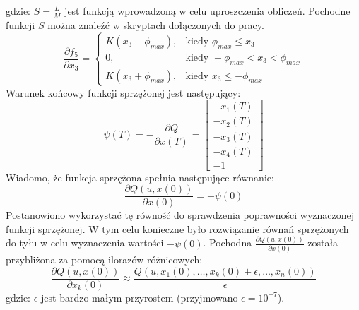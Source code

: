 \noindent gdzie:\newline
\(S=\frac{L}{M}\) jest funkcją wprowadzoną w celu uproszczenia obliczeń. Pochodne funkcji \(S\) można znaleźć w skryptach dołączonych do pracy.
\begin{equation}
\frac{\partial f_5}{\partial x_3}=
	\begin{cases}
	K(x_3-\phi_{max}), & \text{kiedy } \phi_{max}\leqslant x_3\\
	0, & \text{kiedy } -\phi_{max}<x_3<\phi_{max}\\
	K(x_3+\phi_{max}), & \text{kiedy } x_3\leqslant -\phi_{max}
	\end{cases}
\end{equation}
Warunek końcowy funkcji sprzężonej jest następujący:
\begin{equation}
\psi(T)=-\frac{\partial Q}{\partial x(T)}=
\begin{bmatrix}
-x_1(T)\\
-x_2(T)\\
-x_3(T)\\
-x_4(T)\\
-1
\end{bmatrix}
\end{equation}
Wiadomo, że funkcja sprzężona spełnia następujące równanie:
\begin{equation}
\frac{\partial Q(u,x(0))}{\partial x(0)}=-\psi(0)
\label{eq:check_psi}
\end{equation}
Postanowiono wykorzystać tę równość do sprawdzenia poprawności wyznaczonej funkcji sprzężonej. W tym celu konieczne było rozwiązanie równań sprzężonych do tyłu w celu wyznaczenia wartości \(-\psi(0)\). Pochodna \(\frac{\partial Q(u,x(0))}{\partial x(0)}\) została przybliżona za pomocą ilorazów różnicowych:
\begin{equation}
\frac{\partial Q(u,x(0))}{\partial x_k(0)}\approx\frac{Q(u,x_1(0),\dots, x_k(0)+\epsilon,\dots,x_n(0))}{\epsilon}
\end{equation}
\noindent gdzie:\newline
\(\epsilon\) jest bardzo małym przyrostem (przyjmowano \(\epsilon=10^{-7}\)).
